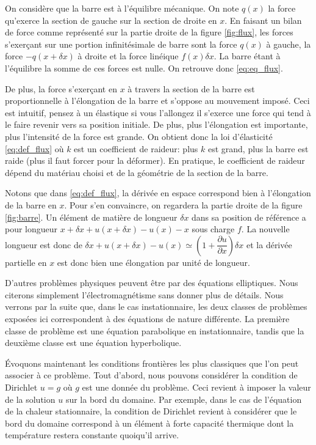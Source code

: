 \documentclass[12pt,a4paper,twoside]{article}
\begin{document}
On consid\`ere que la barre est \`a l'\'equilibre m\'ecanique.
On note $q(x)$ la force qu'exerce la section de gauche sur la section de droite
en $x$. En faisant un bilan de force comme repr\'esent\'e 
sur la partie droite de la figure \ref{fig:flux},
les forces s'exer\c{c}ant sur une portion infinit\'esimale de barre sont
la force $q(x)$ \`a gauche, la force $-q(x+\delta x)$ \`a droite
et la force lin\'eique $f(x) \delta x$. La barre \'etant \`a l'\'equilibre la somme de ces forces
est nulle. On retrouve donc \eqref{eq:eq_flux}.


De plus, la force s'exer\c{c}ant en $x$ \`a travers la section de la barre est 
proportionnelle \`a l'\'elongation de la barre et s'oppose au mouvement impos\'e.
Ceci est intuitif, pensez \`a un \'elastique si vous l'allongez il s'exerce une force
qui tend \`a le faire revenir vers sa position initiale. De plus, plus l'\'elongation
est importante, plus l'intensit\'e de la force est grande.
On obtient donc la loi d'\'elasticit\'e \eqref{eq:def_flux}
o\`u $k$ est un coefficient de raideur:
plus $k$ est grand, plus la barre est raide (plus il faut forcer pour la d\'eformer).
En pratique, le coefficient de raideur d\'epend du mat\'eriau choisi et
de la g\'eom\'etrie de la section de la barre.

Notons que dans \eqref{eq:def_flux}, la d\'eriv\'ee en espace correspond bien \`a 
l'\'elongation de la barre en $x$. Pour s'en convaincre, on regardera la 
partie droite de la figure \ref{fig:barre}. Un \'el\'ement de mati\`ere de longueur
$\delta x$ dans sa position de r\'ef\'erence a pour longueur 
$x + \delta x + u(x+\delta x) - u(x) - x$ sous charge $f$.
La nouvelle longueur est donc de $\delta x + u(x+\delta x) - u(x) 
\simeq \left(1 + \dfrac{\partial u}{\partial x} \right) \delta x$
et la d\'eriv\'ee partielle en $x$ est donc bien une \'elongation par unit\'e de longueur.


D'autres probl\`emes physiques peuvent \^etre par des \'equations elliptiques.
Nous citerons simplement l'\'electromagn\'etisme sans donner plus de d\'etails.
Nous verrons par la suite que, dans le cas instationnaire,
les deux classes de probl\`emes expos\'ees ici correspondent \`a 
des \'equations de nature diff\'erente.
La premi\`ere classe de probl\`eme est une \'equation parabolique en instationnaire,
tandis que la deuxi\`eme classe est une \'equation hyperbolique.


\'Evoquons maintenant les conditions fronti\`eres les plus classiques
que l'on peut associer \`a ce probl\`eme.
Tout d'abord, nous pouvons consid\'erer la condition de Dirichlet
$u = g$ o\`u $g$ est une donn\'ee du probl\`eme. Ceci revient \`a imposer
la valeur de la solution $u$ sur la bord du domaine.
Par exemple, dans le cas de l'\'equation de la chaleur stationnaire,
la condition de Dirichlet revient \`a consid\'erer que le bord du domaine
correspond \`a un \'el\'ement \`a forte capacit\'e thermique
dont la temp\'erature restera constante quoiqu'il arrive.
\end{document}
